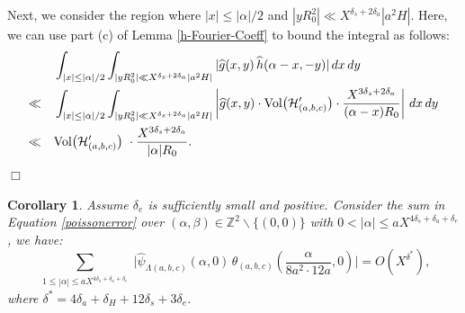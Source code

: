 \documentclass{article}
\def\Vol{{\rm Vol}}
\def\H{{\mathcal H}}
\def\H{{\mathcal H}}
\newtheorem{cor}[theorem]{Corollary}
\newenvironment{proof}{\noindent {\bf Proof:}}{$\Box$ \vspace{2 ex}}
\begin{document}
\begin{proof}
Next, we consider the region where $|x| \leq |\alpha|/2$ and $|y R_0^2| \ll X^{\delta_s + 2 \delta_a} |a^2 H|$. Here, we can use part (c) of Lemma \ref{h-Fourier-Coeff} to bound the integral as follows:
\begin{align*}
    &\int_{|x| \leq |\alpha|/2} \int_{|y R_0^2| \ll X^{\delta_s + 2 \delta_a} |a^2 H|} |\widehat{g}(x, y) \, \widehat{h}(\alpha - x, -y)| \, dx \, dy \\
    \ll \quad &\int_{|x| \leq |\alpha|/2} \int_{|y R_0^2| \ll X^{\delta_s + 2 \delta_a} |a^2 H|} \left|\widehat{g}(x, y) \cdot \Vol\big(\H'_{(a,b,c)}\big) \cdot \frac{X^{3 \delta_s + 2 \delta_a}}{(\alpha - x) R_0}\right| \, dx \, dy \\
    \ll \quad &\Vol\big(\H'_{(a,b,c)}\big)\ \cdot \frac{X^{3 \delta_s + 2 \delta_a}}{|\alpha| R_0}.
\end{align*}
\end{proof}
\begin{cor}\label{beta-zero}
   Assume $\delta_e$ is sufficiently small and positive. Consider the sum in Equation \eqref{poissonerror} over $(\alpha, \beta) \in \mathbb{Z}^2 \backslash \{(0, 0)\}$ with $0<|\alpha| \leq aX^{4\delta_s + \delta_a + \delta_e}$, we have:
   \begin{equation*}
    \sum_{\substack{1 \leq |\alpha| \leq aX^{4\delta_s + \delta_a + \delta_e}}} 
    \Big| \widehat{\psi}_{\Lambda(a, b, c)}(\alpha, 0) \, \widehat{\theta}_{(a, b, c)}\left(\frac{\alpha}{8a^2 \cdot 12a}, 0\right) \Big|=O(X^{\delta^*}),
   \end{equation*}
where $\delta^* = 4\delta_a + \delta_H + 12\delta_s + 3\delta_e$.
\end{cor}
\end{document}
